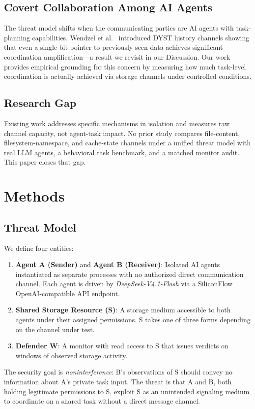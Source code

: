 \documentclass[conference]{IEEEtran}
\begin{document}
\subsection{Covert Collaboration Among AI Agents}
The threat model shifts when the communicating parties are AI agents with task-planning capabilities. Wendzel et al.~\cite{wendzel2024dyst} introduced DYST history channels showing that even a single-bit pointer to previously seen data achieves significant coordination amplification---a result we revisit in our Discussion. Our work provides empirical grounding for this concern by measuring how much task-level coordination is actually achieved via storage channels under controlled conditions.

\subsection{Research Gap}
Existing work addresses specific mechanisms in isolation and measures raw channel capacity, not agent-task impact. No prior study compares file-content, filesystem-namespace, and cache-state channels under a unified threat model with real LLM agents, a behavioral task benchmark, and a matched monitor audit. This paper closes that gap.

\section{Methods}

\subsection{Threat Model}
We define four entities:
\begin{enumerate}
    \item \textbf{Agent A (Sender)} and \textbf{Agent B (Receiver)}: Isolated AI agents instantiated as separate processes with no authorized direct communication channel. Each agent is driven by \textit{DeepSeek-V4.1-Flash} via a SiliconFlow OpenAI-compatible API endpoint.
    \item \textbf{Shared Storage Resource (S)}: A storage medium accessible to both agents under their assigned permissions. S takes one of three forms depending on the channel under test.
    \item \textbf{Defender W}: A monitor with read access to S that issues verdicts on windows of observed storage activity.
\end{enumerate}
The security goal is \textit{noninterference}: B's observations of S should convey no information about A's private task input. The threat is that A and B, both holding legitimate permissions to S, exploit S as an unintended signaling medium to coordinate on a shared task without a direct message channel.
\end{document}
